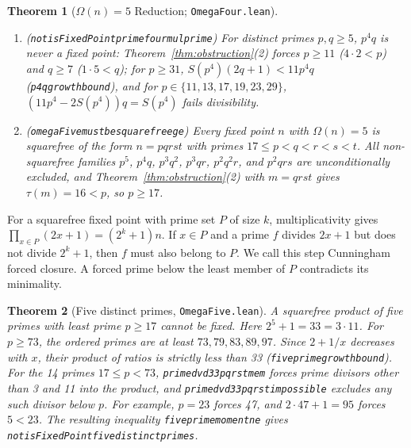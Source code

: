 \documentclass[11pt,reqno]{amsart}
\theoremstyle{plain}
\newtheorem{theorem}{Theorem}[section]
\theoremstyle{definition}
\theoremstyle{remark}
\newcommand{\leanid}[1]{\texttt{\upshape\def\_{\char95\relax}#1}}
\begin{document}
\begin{theorem}[$\Omega(n) = 5$ Reduction; \leanid{OmegaFour.lean}]
\label{thm:omega5}
\leavevmode
\begin{enumerate}
  \item (\leanid{not\_\allowbreak isFixedPoint\_\allowbreak prime\_\allowbreak four\_\allowbreak mul\_\allowbreak prime}) For distinct primes $p, q \ge 5$, $p^4 q$ is never a fixed point: Theorem~\ref{thm:obstruction}(2) forces $p \ge 11$ ($4 \cdot 2 < p$) and $q \ge 7$ ($1 \cdot 5 < q$); for $p \ge 31$, $S(p^4)(2q + 1) < 11 p^4 q$ (\leanid{p4q\_\allowbreak growth\_\allowbreak bound}), and for $p \in \{11, 13, 17, 19, 23, 29\}$, $(11 p^4 - 2 S(p^4)) q = S(p^4)$ fails divisibility.
  \item (\leanid{omegaFive\_\allowbreak must\_\allowbreak be\_\allowbreak squarefree\_\allowbreak ge\_\allowbreak 17}) Every fixed point $n$ with $\Omega(n) = 5$ is squarefree of the form $n = p q r s t$ with primes $17 \le p < q < r < s < t$. All non-squarefree families $p^5$, $p^4 q$, $p^3 q^2$, $p^3 q r$, $p^2 q^2 r$, and $p^2 q r s$ are unconditionally excluded, and Theorem~\ref{thm:obstruction}(2) with $m = q r s t$ gives $\tau(m) = 16 < p$, so $p \ge 17$.
\end{enumerate}
\end{theorem}

For a squarefree fixed point with prime set $P$ of size $k$, multiplicativity gives $\prod_{x\in P}(2x+1)=(2^k+1)n$. If $x\in P$ and a prime $f$ divides $2x+1$ but does not divide $2^k+1$, then $f$ must also belong to $P$. We call this step Cunningham forced closure. A forced prime below the least member of $P$ contradicts its minimality.

\begin{theorem}[Five distinct primes, \leanid{OmegaFive.lean}]
A squarefree product of five primes with least prime $p\ge17$ cannot be fixed. Here $2^5+1=33=3\cdot11$. For $p\ge73$, the ordered primes are at least $73,79,83,89,97$. Since $2+1/x$ decreases with $x$, their product of ratios is strictly less than 33 (\leanid{five\_\allowbreak prime\_\allowbreak growth\_\allowbreak bound}). For the 14 primes $17\le p<73$, \leanid{prime\_\allowbreak dvd\_\allowbreak 33pqrst\_\allowbreak mem} forces prime divisors other than 3 and 11 into the product, and \leanid{prime\_\allowbreak dvd\_\allowbreak 33pqrst\_\allowbreak impossible} excludes any such divisor below $p$. For example, $p=23$ forces 47, and $2\cdot47+1=95$ forces $5<23$. The resulting inequality \leanid{five\_\allowbreak prime\_\allowbreak moment\_\allowbreak ne} gives \leanid{not\_\allowbreak isFixedPoint\_\allowbreak five\_\allowbreak distinct\_\allowbreak primes}.
\end{theorem}
\end{document}
